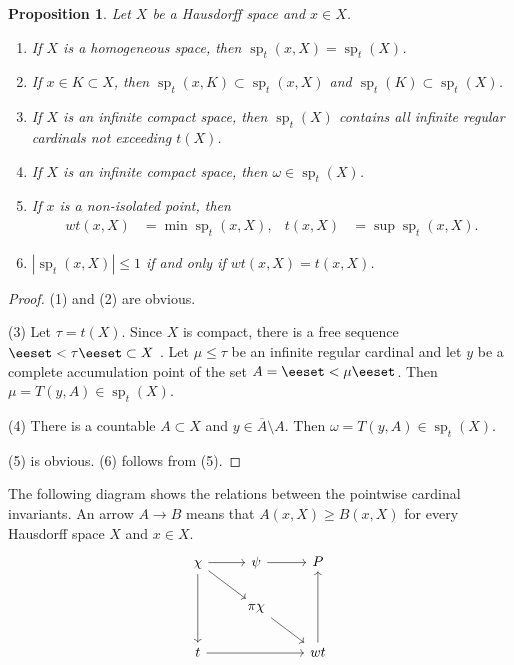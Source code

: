 \documentclass[preprint]{elsarticle}
\def\om{\omega}
\def\al{\alpha}
\def\cl#1{\overline{#1}}
\def\sp{\operatorname{sp}}
\def\set#1{\bbset#1\eeset}
\def\bbset#1:#2\eeset{\{#1\,:\,#2\}}
\newtheorem{proposition}{Proposition}[section]
\theoremstyle{definition}
\theoremstyle{remark}
\begin{document}
\begin{proposition}\label{p:1}
Let $X$ be a Hausdorff space and $x\in X$.
\begin{enumerate}
\item
If $X$ is a homogeneous space, then $\sp_t(x,X)=\sp_t(X)$.
\item
If $x\in K\subset X$, then $\sp_t(x,K)\subset \sp_t(x,X)$ and $\sp_t(K)\subset \sp_t(X)$.
\item
If $X$ is an infinite compact space, then $\sp_t(X)$ contains all infinite regular cardinals not exceeding $t(X)$.
\item
If $X$ is an infinite compact space, then $\om\in \sp_t(X)$.
\item
If $x$ is a non-isolated point, then
\begin{align*}
wt(x,X)&=\min \sp_t(x,X),
&
t(x,X)&=\sup \sp_t(x,X).
\end{align*}
\item
$|\sp_t(x,X)|\leq 1$ if and only if $wt(x,X)=t(x,X)$.
\end{enumerate}
\end{proposition}
\begin{proof}
(1) and (2) are obvious.

(3) Let $\tau=t(X)$. Since $X$ is compact, there is a free sequence $\set{x_\al:\al<\tau}\subset X$ \cite[Theorem 7.12]{Hodel1984handbook}.
Let $\mu\leq\tau$ be an infinite regular cardinal and let $y$ be a complete accumulation point of the set $A=\set{x_\al:\al<\mu}$. Then $\mu=T(y,A)\in \sp_t(X)$.

(4) There is a countable $A\subset X$ and $y\in \cl A\setminus A$. Then $\om=T(y,A)\in \sp_t(X)$.

(5) is obvious. (6) follows from (5).
\end{proof}


The following diagram shows the relations between the pointwise cardinal invariants. An arrow $A\to B$ means that $A(x,X)\geq B(x,X)$ for every Hausdorff space $X$ and $x\in X$.
\[
\begin{tikzcd}
\chi \ar[r] \ar[dd] \ar[rd]	&	\psi \ar[r]	&	P 
\\
 & \pi\chi \ar[rd]
\\
t \ar[rr]	&&	wt \ar[uu]
\end{tikzcd}
\]


\end{document}
